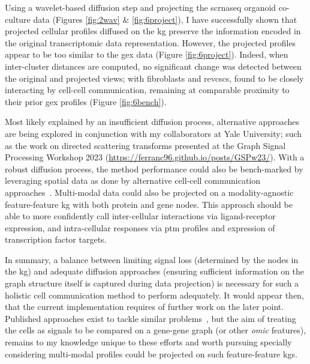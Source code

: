 Using a wavelet-based diffusion step and projecting the \acrshort{scrnaseq} organoid co-culture data (Figures \ref{fig:2wav} \& \ref{fig:6project}), I have successfully shown that projected cellular profiles diffused on the \acrshort{kg} preserve the information encoded in the original transcriptomic data representation. However, the projected profiles appear to be too similar to the \acrfull{gex} data (Figure \ref{fig:6project}). Indeed, when inter-cluster distances are computed, no significant change was detected between the original and projected views; with fibroblasts and \acrshort{revcsc}s, found to be closely interacting by cell-cell communication, remaining at comparable proximity to their prior \acrshort{gex} profiles (Figure \ref{fig:6bench}).

Most likely explained by an insufficient diffusion process, alternative approaches are being explored in conjunction with my collaborators at Yale University; such as the work on directed scattering transforms presented at the Graph Signal Processing Workshop 2023 (\url{https://ferranc96.github.io/posts/GSPw23/}). With a robust diffusion process, the method performance could also be bench-marked by leveraging spatial data as done by alternative cell-cell communication approaches~\cite{fischer_modeling_2022}. Multi-modal data could also be projected on a modality-agnostic feature-feature \acrshort{kg} with both protein and gene nodes. This approach should be able to more confidently call inter-cellular interactions via ligand-receptor expression, and intra-cellular responses via \acrshort{ptm} profiles and expression of transcription factor targets.

In summary, a balance between limiting signal loss (determined by the nodes in the \acrshort{kg}) and adequate diffusion approaches (ensuring sufficient information on the graph structure itself is captured during data projection) is necessary for such a holistic cell communication method to perform adequately. It would appear then, that the current implementation requires of further work on the later point. Published approaches exist to tackle similar problems~\cite{lefebvre_large-scale_2021, yang_sctenifoldxct_2023}, but the aim of treating the cells as signals to be compared on a gene-gene graph (or other \emph{omic} features), remains to my knowledge unique to these efforts and worth pursuing specially considering multi-modal profiles could be projected on such feature-feature \acrshort{kg}s. 






